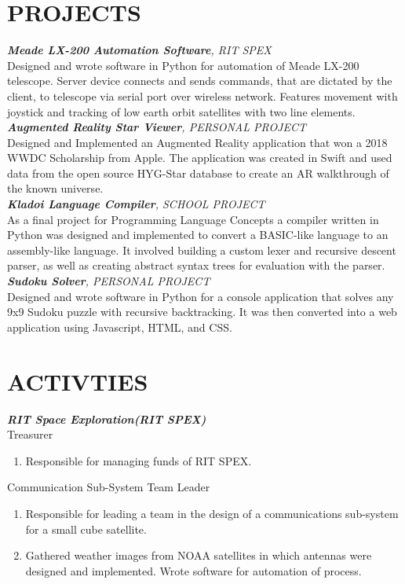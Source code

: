 \documentclass[line, margin]{res}
\begin{document}
\begin{resume}
\section{PROJECTS}
\textit{\textbf{Meade LX-200 Automation Software}, RIT SPEX}\\
Designed and wrote software in Python for automation of Meade LX-200 telescope. Server device connects and sends commands, that are dictated by the client, to telescope via serial port over wireless network. Features movement with joystick and tracking of low earth orbit satellites with two line elements.
\\ [10pt]
\textit{\textbf{Augmented Reality Star Viewer}, PERSONAL PROJECT}\\
Designed and Implemented an Augmented Reality application that won a 2018 WWDC Scholarship from Apple.  The application was created in Swift and used data from the open source HYG-Star database to create an AR walkthrough of the known universe.
\\ [10pt]
\textit{\textbf{Kladoi Language Compiler}, SCHOOL PROJECT}\\
As a final project for Programming Language Concepts a compiler written in Python was designed and implemented to convert a BASIC-like language to an assembly-like language.  It involved building a custom lexer and recursive descent parser, as well as creating abstract syntax trees for evaluation with the parser.
\\ [10pt]
\textit{\textbf{Sudoku Solver}, PERSONAL PROJECT}\\
Designed and wrote software in Python for a console application that solves any 9x9 Sudoku puzzle with recursive backtracking.  It was then converted into a web application using Javascript, HTML, and CSS.


\section{ACTIVTIES}
\textit{\textbf{RIT Space Exploration(RIT SPEX)}}\\
Treasurer
      \begin{enumerate}[series=MyList, label=\textbullet]
        \item Responsible for managing funds of RIT SPEX.
      \end{enumerate}
      
Communication Sub-System Team Leader
      \begin{enumerate}[series=MyList, label=\textbullet]
        \item Responsible for leading a team in the design of a communications sub-system for a small cube satellite.
        \item Gathered weather images from NOAA satellites in which antennas were designed and implemented. Wrote software for automation of process.
      \end{enumerate}
      


\end{resume}
\end{document}
